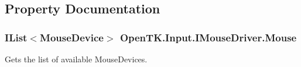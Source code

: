 \subsection{Property Documentation}
\hypertarget{interface_open_t_k_1_1_input_1_1_i_mouse_driver_a1296e581e67f3306448f4ca426e50bd2}{
\subsubsection[{Mouse}]{\setlength{\rightskip}{0pt plus 5cm}I\-List$<${\bf Mouse\-Device}$>$ Open\-T\-K.\-Input.\-I\-Mouse\-Driver.\-Mouse\hspace{0.3cm}{\ttfamily [get]}}}\label{interface_open_t_k_1_1_input_1_1_i_mouse_driver_a1296e581e67f3306448f4ca426e50bd2}


Gets the list of available Mouse\-Devices. 

